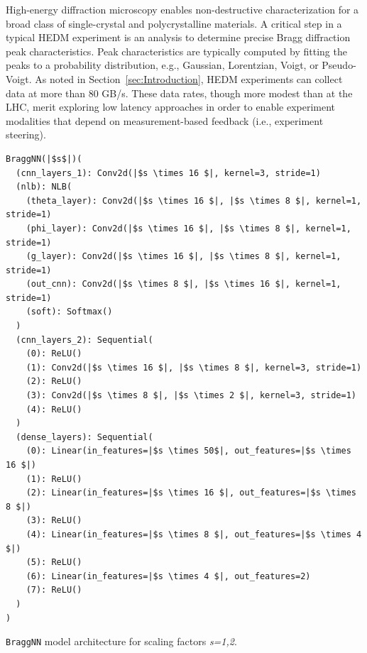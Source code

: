 \documentclass[10pt]{sig-alternate}
\begin{document}
High-energy diffraction microscopy enables non-destructive
characterization for a broad class of single-crystal and polycrystalline
materials.
A critical step in a typical HEDM experiment is an analysis to determine precise Bragg diffraction peak characteristics.
Peak characteristics are typically computed
by fitting the peaks to a probability distribution, e.g., Gaussian,
Lorentzian, Voigt, or Pseudo-Voigt. As noted in Section~\ref{sec:Introduction}, HEDM experiments can collect data
at more than 80 GB/s. These data rates, though more modest than at the LHC,
merit exploring low latency approaches %
in order to enable experiment modalities that
depend on measurement-based feedback (i.e., experiment steering).
\begin{listing}
\begin{verbatim}
BraggNN(|$s$|)(
  (cnn_layers_1): Conv2d(|$s \times 16 $|, kernel=3, stride=1)
  (nlb): NLB(
    (theta_layer): Conv2d(|$s \times 16 $|, |$s \times 8 $|, kernel=1, stride=1)
    (phi_layer): Conv2d(|$s \times 16 $|, |$s \times 8 $|, kernel=1, stride=1)
    (g_layer): Conv2d(|$s \times 16 $|, |$s \times 8 $|, kernel=1, stride=1)
    (out_cnn): Conv2d(|$s \times 8 $|, |$s \times 16 $|, kernel=1, stride=1)
    (soft): Softmax()
  )
  (cnn_layers_2): Sequential(
    (0): ReLU()
    (1): Conv2d(|$s \times 16 $|, |$s \times 8 $|, kernel=3, stride=1)
    (2): ReLU()
    (3): Conv2d(|$s \times 8 $|, |$s \times 2 $|, kernel=3, stride=1)
    (4): ReLU()
  )
  (dense_layers): Sequential(
    (0): Linear(in_features=|$s \times 50$|, out_features=|$s \times 16 $|)
    (1): ReLU()
    (2): Linear(in_features=|$s \times 16 $|, out_features=|$s \times 8 $|)
    (3): ReLU()
    (4): Linear(in_features=|$s \times 8 $|, out_features=|$s \times 4 $|)
    (5): ReLU()
    (6): Linear(in_features=|$s \times 4 $|, out_features=2)
    (7): ReLU()
  )
)
\end{verbatim}

\vspace{-1ex}

\caption{\texttt{BraggNN} model architecture for scaling factors \emph{s=1,2}.\label{lis:braggnn}}
\end{listing}
\end{document}
